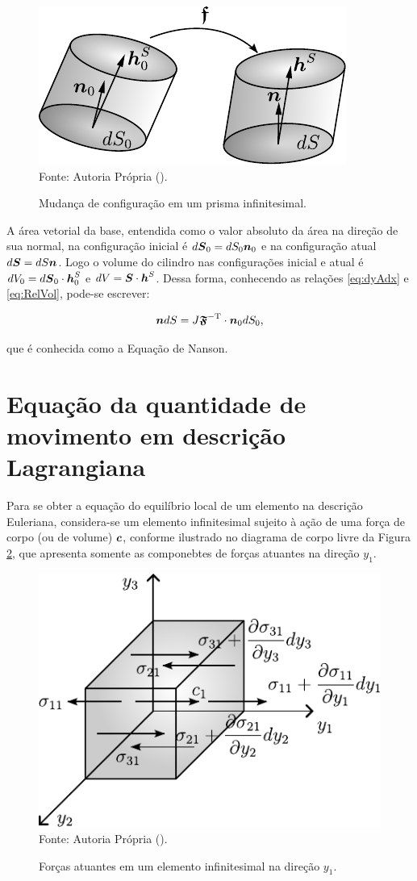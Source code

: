\begin{figure}[h!]
    \centering
    \caption{Mudança de configuração em um prisma infinitesimal.}
    \includegraphics[width=.45\linewidth]{Figuras/Nanson.pdf}
    \\Fonte: Autoria Própria (\the\year).
    \label{fig:Nanson}
\end{figure}

A área vetorial da base, entendida como o valor absoluto da área na direção de sua normal, na configuração inicial é $d\boldsymbol{S}_0=dS_0\boldsymbol{n}_0$ e na configuração atual $d\boldsymbol{S}=dS\boldsymbol{n}$. Logo o volume do cilindro nas configurações inicial e atual é $dV_0=d\boldsymbol{S}_0\cdot\boldsymbol{h}^S_0$ e $dV=\boldsymbol{S}\cdot\boldsymbol{h}^S$. Dessa forma, conhecendo as relações \eqref{eq:dyAdx} e \eqref{eq:RelVol}, pode-se escrever:

\begin{equation}
    \boldsymbol{n}dS=J\boldsymbol{\mathfrak{F}}^\mathrm{-T}\cdot\boldsymbol{n}_0dS_0\text{,}\label{eq:Nanson}
\end{equation}

\noindent que é conhecida como a Equação de Nanson.

\section{Equação da quantidade de movimento em descrição Lagrangiana}

Para se obter a equação do equilíbrio local de um elemento na descrição Euleriana, considera-se um elemento infinitesimal sujeito à ação de uma força de corpo (ou de volume) $\boldsymbol{c}$, conforme ilustrado no diagrama de corpo livre da Figura \ref{fig:CorpoLivreSolido}, que apresenta somente as componebtes de forças atuantes na direção $y_1$.

\begin{figure}[h!]
    \centering
    \caption{Forças atuantes em um elemento infinitesimal na direção $y_1$.}
    \includegraphics[width=.5\linewidth]{Figuras/CorpoLivreSolido.pdf}
    \\Fonte: Autoria Própria (\the\year).
    \label{fig:CorpoLivreSolido}
\end{figure}

